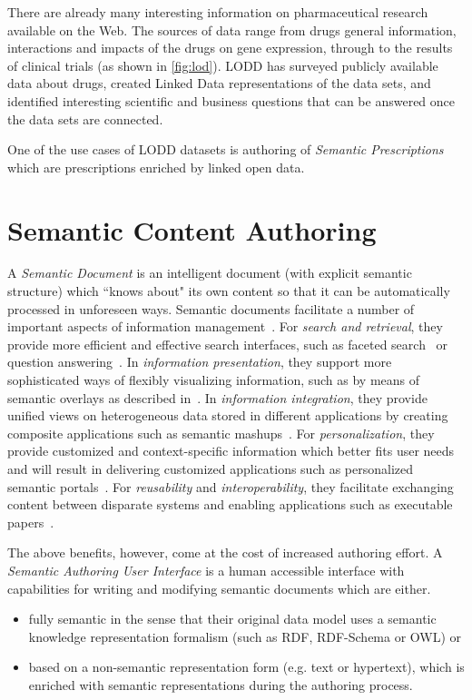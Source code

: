 \documentclass[10pt, conference, compsocconf]{IEEEtran}
\begin{document}
There are already many interesting information on pharmaceutical research available on the Web.
The sources of data range from drugs general information, interactions and impacts of the drugs on gene expression, through to the results of clinical trials (as shown in \autoref{fig:lod}).
LODD\cite{lodrug} has surveyed publicly available data about drugs, created Linked Data representations of the data sets, and identified interesting scientific and business questions that can be answered once the data sets are connected.

One of the use cases of LODD datasets is authoring of \emph{Semantic Prescriptions} which are prescriptions enriched by linked open data.

\section{Semantic Content Authoring}
\label{sec:sca}
 A \emph{Semantic Document} is an intelligent document (with explicit semantic structure) which ``knows about" its own content so that it can be automatically processed in unforeseen ways.
Semantic documents facilitate a number of important aspects of information management~\cite{rdface}.
For \emph{search and retrieval}, they provide more efficient and effective search interfaces, such as faceted search~\cite{tunkenlang2009faceted} or question answering~\cite{Lopez2011}.
In \emph{information presentation}, they support more sophisticated ways of flexibly visualizing information, such as by means of semantic overlays as described in~\cite{Burel2009}.
In \emph{information integration}, they provide unified views on heterogeneous data stored in different applications by creating composite applications such as semantic mashups~\cite{Ankolekar2007}.
For \emph{personalization}, they provide customized and context-specific information which better fits user needs and will
result in delivering customized applications such as personalized semantic portals~\cite{ecs2007}.
For \emph{reusability} and \emph{interoperability}, they facilitate exchanging content between disparate systems and enabling applications such as executable papers~\cite{Muller2011}.


The above benefits, however, come at the cost of increased authoring effort. %
A \emph{Semantic Authoring User Interface} is a human accessible interface with capabilities for writing and modifying semantic documents which are either.
\begin{itemize}
	\item fully semantic in the sense that their original data model uses a semantic knowledge representation formalism (such as RDF, RDF-Schema or OWL) or
	\item based on a non-semantic representation form (e.g. text or hypertext), which is enriched with semantic representations during the authoring process.\\
\end{itemize}
\end{document}
